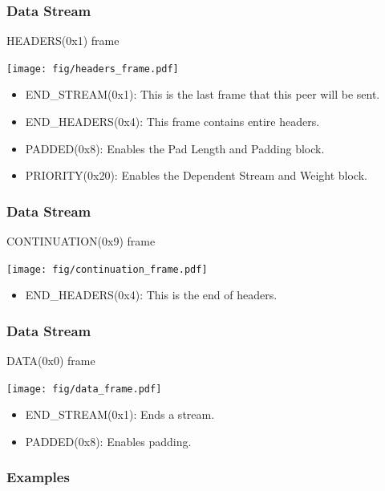 \documentclass[lualatex]{beamer}
\begin{document}
\begin{frame}
  \frametitle{Data Stream}

  \begin{block}{HEADERS(0x1) frame}
    \begin{center}
      \texttt{[image: fig/headers\_frame.pdf]}
    \end{center}
    \begin{itemize}
    \item END\_STREAM(0x1): This is the last frame that this peer will be sent.
    \item END\_HEADERS(0x4): This frame contains entire headers.
    \item PADDED(0x8): Enables the Pad Length and Padding block.
    \item PRIORITY(0x20): Enables the Dependent Stream and Weight block.
    \end{itemize}
  \end{block}
\end{frame}

\begin{frame}
  \frametitle{Data Stream}

  \begin{block}{CONTINUATION(0x9) frame}
    \begin{center}
      \texttt{[image: fig/continuation\_frame.pdf]}
    \end{center}
    \begin{itemize}
    \item END\_HEADERS(0x4): This is the end of headers.
    \end{itemize}
  \end{block}
\end{frame}

\begin{frame}
  \frametitle{Data Stream}

  \begin{block}{DATA(0x0) frame}
    \begin{center}
      \texttt{[image: fig/data\_frame.pdf]}
    \end{center}
    \begin{itemize}
    \item END\_STREAM(0x1): Ends a stream.
    \item PADDED(0x8): Enables padding.
    \end{itemize}
  \end{block}
\end{frame}

\subsubsection{Examples}
\end{document}
